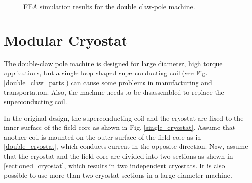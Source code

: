 \documentclass[12pt]{IET02}
\begin{document}
\begin{figure}[]
\centering

  \caption{FEA simulation results for the double claw-pole machine.} 
  \label{FEA_results}
\end{figure}


\section{Modular Cryostat} %
\label{sec:modular_cryostat}

The double-claw pole machine is designed for large diameter, high torque applications, but a single loop shaped superconducting coil (see Fig. \ref{double_claw_parts}) can cause some problems in manufacturing and transportation. Also, the machine needs to be disassembled to replace the superconducting coil.

In the original design, the superconducting coil and the cryostat are fixed to the inner surface of the field core as shown in Fig. \ref{single_cryostat}. Assume that another coil is mounted on the outer surface of the field core as in \ref{double_cryostat}, which conducts current in the opposite direction. Now, assume that the cryostat and the field core are divided into two sections as shown in \ref{sectioned_cryostat}, which results in two independent cryostats. It is also possible to use more than two cryostat sections in a large diameter machine.
\end{document}
